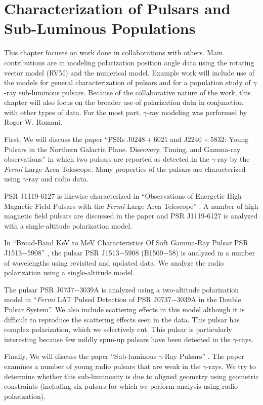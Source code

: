 \chapter[Characterization]{Characterization of Pulsars and Sub-Luminous Populations}
\label{chapter:collaborationWork}

This chapter focuses on work done in collaborations with others.
Main contributions are in modeling polarization position angle data
using the rotating vector model (RVM) and the numerical model. 
Example work will include use
of the models 
for general characterization of pulsars
and for a population study of $\gamma$-ray sub-luminous pulsars.
Because of the collaborative nature of the
work, this chapter will also focus on the broader use of polarization
data in conjunction with other types of data.
For the most part, $\gamma$-ray
modeling was performed by Roger W. Romani.

First, We will discuss the paper ``PSRs J$0248+6021$ and J$2240+5832$: Young Pulsars 
in the Northern Galactic Plane. Discovery, Timing, and Gamma-ray observations''
\citep{theureau2011psrs} in which two pulsars are reported as detected in the $\gamma$-ray
by the {\it Fermi} Large Area Telescope.  Many properties of the pulsars are characterized
using $\gamma$-ray and radio data.

PSR J1119-6127 is likewise characterized in ``Observations of Energetic High Magnetic Field Pulsars with the
{\it Fermi} Large Area Telescope'' \citep{parent2011observations}.  
A number of high magnetic field pulsars are discussed in the paper and PSR J1119-6127
is analyzed with a single-altitude polarization model.

In ``Broad-Band KeV to MeV Characteristics Of Soft Gamma-Ray Pulsar PSR J1513$-$5908''
\citep{hartogJ1513}, the pulsar PSR J1513$-$5908 (B1509$-$58) is analyzed in a 
number of wavelengths using revisited and updated data.  We analyze the
radio polarization using a single-altitude model.

The pulsar PSR J0737$-$3039A is analyzed using a two-altitude 
polarization model in ``{\it Fermi} LAT Pulsed
Detection of PSR J0737$-$3039A in the Double Pulsar System''.
We also include scattering effects in this model although it 
is difficult to reproduce the scattering effects seen in the data.  
This pulsar has complex polarization, which we selectively
cut.  This pulsar is particularly interesting because few
mildly spun-up pulsars have been detected in the $\gamma$-rays.

Finally, We will discuss the paper ``Sub-luminous $\gamma$-Ray Pulsars''
\citep{romani2011sub}.  The paper examines a number of young radio pulsars
that are weak in the $\gamma$-rays.  We try to determine
whether this sub-luminosity is due to
aligned geometry
using geometric constraints 
(including six pulsars for which we perform analysis using radio polarization).


